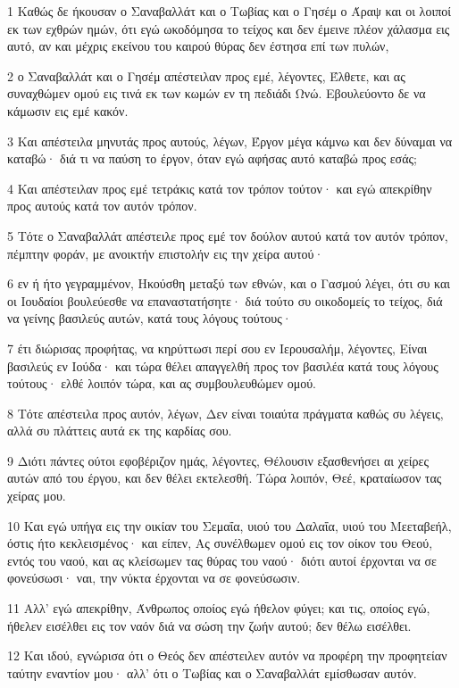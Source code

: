 \par 1 Καθώς δε ήκουσαν ο Σαναβαλλάτ και ο Τωβίας και ο Γησέμ ο Άραψ και οι λοιποί εκ των εχθρών ημών, ότι εγώ ωκοδόμησα το τείχος και δεν έμεινε πλέον χάλασμα εις αυτό, αν και μέχρις εκείνου του καιρού θύρας δεν έστησα επί των πυλών,
\par 2 ο Σαναβαλλάτ και ο Γησέμ απέστειλαν προς εμέ, λέγοντες, Έλθετε, και ας συναχθώμεν ομού εις τινά εκ των κωμών εν τη πεδιάδι Ωνώ. Εβουλεύοντο δε να κάμωσιν εις εμέ κακόν.
\par 3 Και απέστειλα μηνυτάς προς αυτούς, λέγων, Έργον μέγα κάμνω και δεν δύναμαι να καταβώ· διά τι να παύση το έργον, όταν εγώ αφήσας αυτό καταβώ προς εσάς;
\par 4 Και απέστειλαν προς εμέ τετράκις κατά τον τρόπον τούτον· και εγώ απεκρίθην προς αυτούς κατά τον αυτόν τρόπον.
\par 5 Τότε ο Σαναβαλλάτ απέστειλε προς εμέ τον δούλον αυτού κατά τον αυτόν τρόπον, πέμπτην φοράν, με ανοικτήν επιστολήν εις την χείρα αυτού·
\par 6 εν ή ήτο γεγραμμένον, Ηκούσθη μεταξύ των εθνών, και ο Γασμού λέγει, ότι συ και οι Ιουδαίοι βουλεύεσθε να επαναστατήσητε· διά τούτο συ οικοδομείς το τείχος, διά να γείνης βασιλεύς αυτών, κατά τους λόγους τούτους·
\par 7 έτι διώρισας προφήτας, να κηρύττωσι περί σου εν Ιερουσαλήμ, λέγοντες, Είναι βασιλεύς εν Ιούδα· και τώρα θέλει απαγγελθή προς τον βασιλέα κατά τους λόγους τούτους· ελθέ λοιπόν τώρα, και ας συμβουλευθώμεν ομού.
\par 8 Τότε απέστειλα προς αυτόν, λέγων, Δεν είναι τοιαύτα πράγματα καθώς συ λέγεις, αλλά συ πλάττεις αυτά εκ της καρδίας σου.
\par 9 Διότι πάντες ούτοι εφοβέριζον ημάς, λέγοντες, Θέλουσιν εξασθενήσει αι χείρες αυτών από του έργου, και δεν θέλει εκτελεσθή. Τώρα λοιπόν, Θεέ, κραταίωσον τας χείρας μου.
\par 10 Και εγώ υπήγα εις την οικίαν του Σεμαΐα, υιού του Δαλαΐα, υιού του Μεεταβεήλ, όστις ήτο κεκλεισμένος· και είπεν, Ας συνέλθωμεν ομού εις τον οίκον του Θεού, εντός του ναού, και ας κλείσωμεν τας θύρας του ναού· διότι αυτοί έρχονται να σε φονεύσωσι· ναι, την νύκτα έρχονται να σε φονεύσωσιν.
\par 11 Αλλ' εγώ απεκρίθην, Άνθρωπος οποίος εγώ ήθελον φύγει; και τις, οποίος εγώ, ήθελεν εισέλθει εις τον ναόν διά να σώση την ζωήν αυτού; δεν θέλω εισέλθει.
\par 12 Και ιδού, εγνώρισα ότι ο Θεός δεν απέστειλεν αυτόν να προφέρη την προφητείαν ταύτην εναντίον μου· αλλ' ότι ο Τωβίας και ο Σαναβαλλάτ εμίσθωσαν αυτόν.
